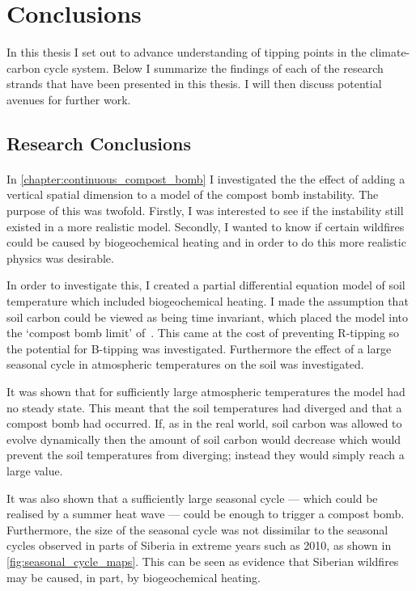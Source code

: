 \chapter{Conclusions}
\graphicspath{{conclusions/figs}}
\label{chapter:conclusions}

In this thesis I set out to advance understanding of tipping points in the climate-carbon cycle system.
Below I summarize the findings of each of the research strands that have been presented in this thesis. I will then discuss potential avenues for further work.

\section{Research Conclusions}
\subsubsection{}

In \cref{chapter:continuous_compost_bomb} I investigated the the effect of adding a vertical spatial dimension to a model of the compost bomb instability.
The purpose of this was twofold. 
Firstly, I was interested to see if the instability still existed in a more realistic model.
Secondly, I wanted to know if certain wildfires could be caused by biogeochemical heating and in order to do this more realistic physics was desirable.

In order to investigate this, I created a partial differential equation model of soil temperature which included biogeochemical heating. I made the assumption
that soil carbon could be viewed as being time invariant, which placed the model into the `compost bomb limit' of~\cite{Luke2011}. This came at the cost of preventing
R-tipping so the potential for B-tipping was investigated. Furthermore the effect of a large seasonal cycle in atmospheric temperatures on the soil was investigated.

It was shown that for sufficiently large atmospheric temperatures the model had no steady state. This meant that the soil temperatures had diverged and that a compost bomb
had occurred. If, as in the real world, soil carbon was allowed to evolve dynamically then the amount of soil carbon would decrease which would prevent the soil temperatures from diverging;
instead they would simply reach a large value.

It was also shown that a sufficiently large seasonal cycle --- which could be realised by a summer heat wave --- could be enough to trigger a compost bomb.
Furthermore, the size of the seasonal cycle was not dissimilar to the seasonal cycles observed in parts of Siberia in extreme years such as 2010, as shown in \cref{fig:seasonal_cycle_maps}.
This can be seen as evidence that Siberian wildfires may be caused, in part, by biogeochemical heating. 

